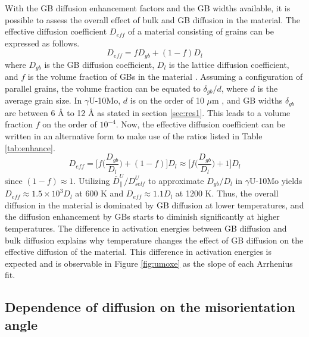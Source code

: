 \documentclass{elsarticle}
\begin{document}
With the GB diffusion enhancement factors and the GB widths available, it is possible to assess the overall effect of bulk and GB diffusion in the material. The effective diffusion coefficient $D_{eff}$ of a material consisting of grains can be expressed as follows.
\begin{equation}
	D_{eff} = f D_{gb} + (1-f) D_l
\end{equation}
where $D_{gb}$ is the GB diffusion coefficient, $D_l$ is the lattice diffusion coefficient, and $f$ is the volume fraction of GBs in the material \cite{mishin1997, heitjans2006}. Assuming a configuration of parallel grains, the volume fraction can be equated to $\delta_{gb} / d$, where $d$ is the average grain size. In $\gamma$U-10Mo, $d$ is on the order of 10 $\mu$m \cite{jana2017, di2021}, and GB widths $\delta_{gb}$ are between 6 \r{A} to 12 \r{A} as stated in section \ref{sec:res1}. This leads to a volume fraction $f$ on the order of $10^{-4}$. Now, the effective diffusion coefficient can be written in an alternative form to make use of the ratios listed in Table \ref{tab:enhance}.
\begin{equation}
	D_{eff} = \bigg[ f \bigg( \frac{D_{gb}}{D_l} \bigg)
		+ (1 - f) \bigg] D_l
	\approx \bigg[ f \bigg( \frac{D_{gb}}{D_l} \bigg) + 1 \bigg] D_l
\end{equation}
since $(1-f) \approx 1$. Utilizing $\overline{D}^U_{\parallel} / D^U_{self}$ to approximate $D_{gb} / D_l$ in $\gamma$U-10Mo yields $D_{eff} \approx 1.5 \times 10^3 D_l$ at 600 K and $D_{eff} \approx 1.1 D_l$ at 1200 K. Thus, the overall diffusion in the material is dominated by GB diffusion at lower temperatures, and the diffusion enhancement by GBs starts to diminish significantly at higher temperatures. The difference in activation energies between GB diffusion and bulk diffusion explains why temperature changes the effect of GB diffusion on the effective diffusion of the material. This difference in activation energies is expected and is observable in Figure \ref{fig:umoxe} as the slope of each Arrhenius fit.


\FloatBarrier
\subsection{Dependence of diffusion on the misorientation angle}
\end{document}
